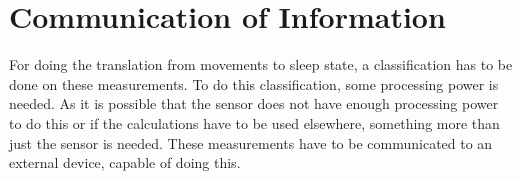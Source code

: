 
\section{Communication of Information} %
\label{sec:communicating_relevant_information}
For doing the translation from movements to sleep state, a classification has to be done on these measurements. To do this classification, some processing power is needed. As it is possible that the sensor does not have enough processing power to do this or if the calculations have to be used elsewhere, something more than just the sensor is needed. These measurements have to be communicated to an external device, capable of doing this.

